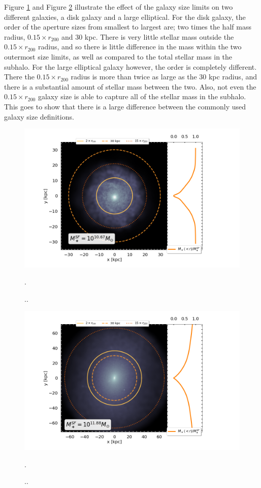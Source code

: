 Figure \ref{gal_size_disk} and Figure \ref{gal_size_big} illustrate the effect of the galaxy size limits on two different galaxies, a disk galaxy and a large elliptical. For the disk galaxy, the order of the aperture sizes from smallest to largest are; two times the half mass radius, $0.15 \times r_{200}$ and 30 kpc. There is very little stellar mass outside the $0.15 \times r_{200}$ radius, and so there is little difference in the mass within the two outermost size limits, as well as compared to the total stellar mass in the subhalo. For the large elliptical galaxy however, the order is completely different. There the $0.15 \times r_{200}$ radius is more than twice as large as the 30 kpc radius, and there is a substantial amount of stellar mass between the two. Also, not even the $0.15 \times r_{200}$ galaxy size is able to capture all of the stellar mass in the subhalo. This goes to show that there is a large difference between the commonly used galaxy size definitions.


\begin{figure}
	\centering
    \includegraphics[width=1\textwidth]{images/galaxy_size_disk.png}
    \caption{..}.
    \label{gal_size_disk}
\end{figure}

\begin{figure}
    \centering
    \includegraphics[width=1\textwidth]{images/galaxy_size_big.png}
    \caption{..}.
    \label{gal_size_big}
\end{figure}


